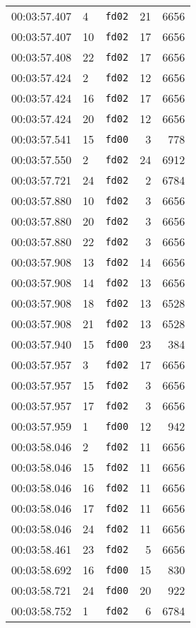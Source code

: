 \documentclass{article}
\begin{document}
\begin{longtable}{lllrr}
00:03:57.407 & 4 & \texttt{fd02} & 21 & 6656 \\
00:03:57.407 & 10 & \texttt{fd02} & 17 & 6656 \\
00:03:57.408 & 22 & \texttt{fd02} & 17 & 6656 \\
00:03:57.424 & 2 & \texttt{fd02} & 12 & 6656 \\
00:03:57.424 & 16 & \texttt{fd02} & 17 & 6656 \\
00:03:57.424 & 20 & \texttt{fd02} & 12 & 6656 \\
00:03:57.541 & 15 & \texttt{fd00} & 3 & 778 \\
00:03:57.550 & 2 & \texttt{fd02} & 24 & 6912 \\
00:03:57.721 & 24 & \texttt{fd02} & 2 & 6784 \\
00:03:57.880 & 10 & \texttt{fd02} & 3 & 6656 \\
00:03:57.880 & 20 & \texttt{fd02} & 3 & 6656 \\
00:03:57.880 & 22 & \texttt{fd02} & 3 & 6656 \\
00:03:57.908 & 13 & \texttt{fd02} & 14 & 6656 \\
00:03:57.908 & 14 & \texttt{fd02} & 13 & 6656 \\
00:03:57.908 & 18 & \texttt{fd02} & 13 & 6528 \\
00:03:57.908 & 21 & \texttt{fd02} & 13 & 6528 \\
00:03:57.940 & 15 & \texttt{fd00} & 23 & 384 \\
00:03:57.957 & 3 & \texttt{fd02} & 17 & 6656 \\
00:03:57.957 & 15 & \texttt{fd02} & 3 & 6656 \\
00:03:57.957 & 17 & \texttt{fd02} & 3 & 6656 \\
00:03:57.959 & 1 & \texttt{fd00} & 12 & 942 \\
00:03:58.046 & 2 & \texttt{fd02} & 11 & 6656 \\
00:03:58.046 & 15 & \texttt{fd02} & 11 & 6656 \\
00:03:58.046 & 16 & \texttt{fd02} & 11 & 6656 \\
00:03:58.046 & 17 & \texttt{fd02} & 11 & 6656 \\
00:03:58.046 & 24 & \texttt{fd02} & 11 & 6656 \\
00:03:58.461 & 23 & \texttt{fd02} & 5 & 6656 \\
00:03:58.692 & 16 & \texttt{fd00} & 15 & 830 \\
00:03:58.721 & 24 & \texttt{fd00} & 20 & 922 \\
00:03:58.752 & 1 & \texttt{fd02} & 6 & 6784 \\

\end{longtable}
\end{document}
